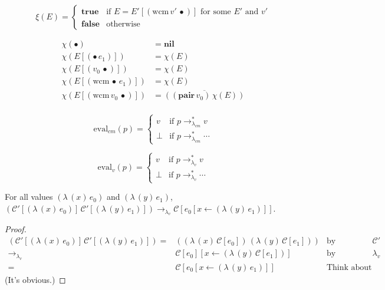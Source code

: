\documentclass[ms,electronic,twosidetoc,letterpaper,chaptercenter,parttop]{byumsphd}
\newcommand{\lv}{$\lambda_v$}
\newcommand{\nil}{\mathbf{nil}}
\newcommand{\pair}[2]{((\mathbf{pair}\,#1)\,#2)}
\newcommand{\eval}[1]{\overline{#1}}
\newcommand{\lvrr}{\rightarrow_{\lambda_v}}
\newcommand{\lvrrs}{\rightarrow_{\lambda_v}^{*}}
\newcommand{\cmrrs}{\rightarrow_{\lambda_{cm}}^{*}}
\newcommand{\C}[1]{\mathcal{C}[#1]}
\newcommand{\Cp}[1]{\mathcal{C}'[#1]}
\newcommand{\abs}[2]{(\lambda\,(#1)\,#2)}
\newcommand{\app}[2]{(#1\,#2)}
\newcommand{\wcm}[2]{(\mathrm{wcm}\,#1\,#2)}
\newcommand{\hole}{\bullet}
\begin{document}
\begin{defn}
\[
\xi(E)=\begin{cases}
\mathbf{true} &\text{if $E=E'[\wcm{v'}{\hole}]$ for some $E'$ and $v'$}\\
\mathbf{false} &\text{otherwise}
\end{cases}
\]
\end{defn}

\begin{defn}
\begin{align*}
\chi(\hole)               &= \nil\\
\chi(E[\app{\hole}{e_1}]) &= \chi(E)\\
\chi(E[\app{v_0}{\hole}]) &= \chi(E)\\
\chi(E[\wcm{\hole}{e_1}]) &= \chi(E)\\
\chi(E[\wcm{v_0}{\hole}]) &= \eval{\pair{v_0}{\chi(E)}}\\
\end{align*}
\end{defn}

\begin{defn}
\[
\mathrm{eval}_{cm}(p)=\begin{cases}
v     &\text{if $p\cmrrs v$}\\
\perp &\text{if $p\cmrrs\cdots$}
\end{cases}
\]
\end{defn}

\begin{defn}
\[
\mathrm{eval}_{v}(p)=\begin{cases}
v     &\text{if $p\lvrrs v$}\\
\perp &\text{if $p\lvrrs\cdots$}
\end{cases}
\]
\end{defn}

\begin{lemma}
\label{cm-app}
For all values $\abs{x}{e_0}$ and $\abs{y}{e_1}$, $\app{\Cp{\abs{x}{e_0}}}{\Cp{\abs{y}{e_1}}}\lvrr\C{e_0[x\leftarrow \abs{y}{e_1}]}$.
\end{lemma}

\begin{proof}
\begin{align*}
\app{\Cp{\abs{x}{e_0}}}{\Cp{\abs{y}{e_1}}} = &\app{\abs{x}{\C{e_0}}}{\abs{y}{\C{e_1}}}&\text{by definition of $\mathcal{C}'$}\\
                                       \lvrr &\C{e_0}[x\leftarrow \abs{y}{\C{e_1}}]&\text{by semantics of \lv}\\
                                           = &\C{e_0[x\leftarrow \abs{y}{e_1}}]&\text{Think about it.}
\end{align*}
(It's obvious.)
\end{proof}
\end{document}

